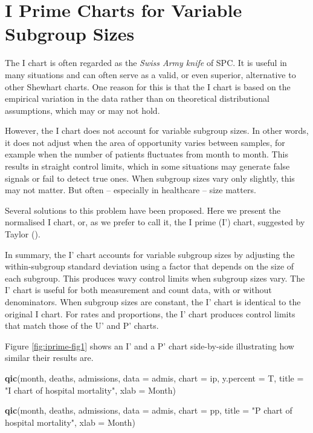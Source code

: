 \documentclass[
]{book}
\newenvironment{Shaded}{\begin{snugshade}}{\end{snugshade}}
\newcommand{\AttributeTok}[1]{\textcolor[rgb]{0.13,0.29,0.53}{#1}}
\newcommand{\FunctionTok}[1]{\textcolor[rgb]{0.13,0.29,0.53}{\textbf{#1}}}
\newcommand{\NormalTok}[1]{#1}
\newcommand{\StringTok}[1]{\textcolor[rgb]{0.31,0.60,0.02}{#1}}
\begin{document}
\chapter{I Prime Charts for Variable Subgroup Sizes}\label{i-prime-charts-for-variable-subgroup-sizes}

The I chart is often regarded as the \emph{Swiss Army knife} of SPC. It is useful in many situations and can often serve as a valid, or even superior, alternative to other Shewhart charts. One reason for this is that the I chart is based on the empirical variation in the data rather than on theoretical distributional assumptions, which may or may not hold.

However, the I chart does not account for variable subgroup sizes. In other words, it does not adjust when the area of opportunity varies between samples, for example when the number of patients fluctuates from month to month. This results in straight control limits, which in some situations may generate false signals or fail to detect true ones. When subgroup sizes vary only slightly, this may not matter. But often -- especially in healthcare -- size matters.

Several solutions to this problem have been proposed. Here we present the normalised I chart, or, as we prefer to call it, the I prime (I') chart, suggested by Taylor ().

In summary, the I' chart accounts for variable subgroup sizes by adjusting the within-subgroup standard deviation using a factor that depends on the size of each subgroup. This produces wavy control limits when subgroup sizes vary. The I' chart is useful for both measurement and count data, with or without denominators. When subgroup sizes are constant, the I' chart is identical to the original I chart. For rates and proportions, the I' chart produces control limits that match those of the U' and P' charts.

Figure \ref{fig:iprime-fig1} shows an I' and a P' chart side-by-side illustrating how similar their results are.

\begin{Shaded}
\begin{Highlighting}[]
\FunctionTok{qic}\NormalTok{(month, deaths, admissions, }
    \AttributeTok{data      =}\NormalTok{ admis, }
    \AttributeTok{chart     =} \StringTok{\textquotesingle{}ip\textquotesingle{}}\NormalTok{, }
    \AttributeTok{y.percent =}\NormalTok{ T,}
    \AttributeTok{title     =} \StringTok{"I\textquotesingle{} chart of hospital mortality"}\NormalTok{,}
    \AttributeTok{xlab      =} \StringTok{\textquotesingle{}Month\textquotesingle{}}\NormalTok{)}

\FunctionTok{qic}\NormalTok{(month, deaths, admissions, }
    \AttributeTok{data  =}\NormalTok{ admis, }
    \AttributeTok{chart =} \StringTok{\textquotesingle{}pp\textquotesingle{}}\NormalTok{,}
    \AttributeTok{title =} \StringTok{"P\textquotesingle{} chart of hospital mortality"}\NormalTok{,}
    \AttributeTok{xlab  =} \StringTok{\textquotesingle{}Month\textquotesingle{}}\NormalTok{)}
\end{Highlighting}
\end{Shaded}
\end{document}
